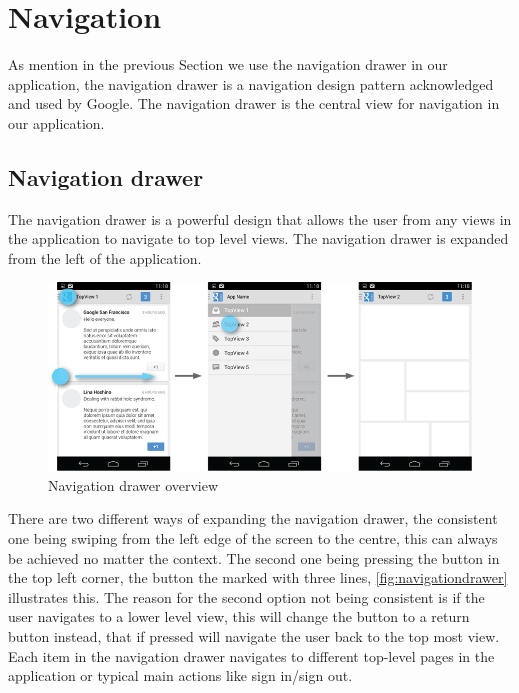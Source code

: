 \section{Navigation}\label{sec:navigation}
As mention in the previous Section we use the navigation drawer in our application, the navigation drawer is a navigation design pattern acknowledged and used by Google.\cite{guidelines-navigationdrawer} The navigation drawer is the central view for navigation in our application.
 
\subsection{Navigation drawer}
The navigation drawer is a powerful design that allows the user from any views in the application to navigate to top level views. The navigation drawer is expanded from the left of the application.
\begin{figure}[H]
\centering
\includegraphics[width=0.9\linewidth]{img/screenshots/navigation_drawer_overview.png}
\caption{Navigation drawer overview \cite{guidelines-navigationdrawer}}
\label{fig:navigationdrawer}
\end{figure}
There are two different ways of expanding the navigation drawer, the consistent one being swiping from the left edge of the screen to the centre, this can always be achieved no matter the context. 
The second one being pressing the button in the top left corner, the button the marked with three lines, \autoref{fig:navigationdrawer} illustrates this. 
The reason for the second option not being consistent is if the user navigates to a lower level view, this will change the button to a return button instead, that if pressed will navigate the user back to the top most view. 
Each item in the navigation drawer navigates to different top-level pages in the application or typical main actions like sign in/sign out.

